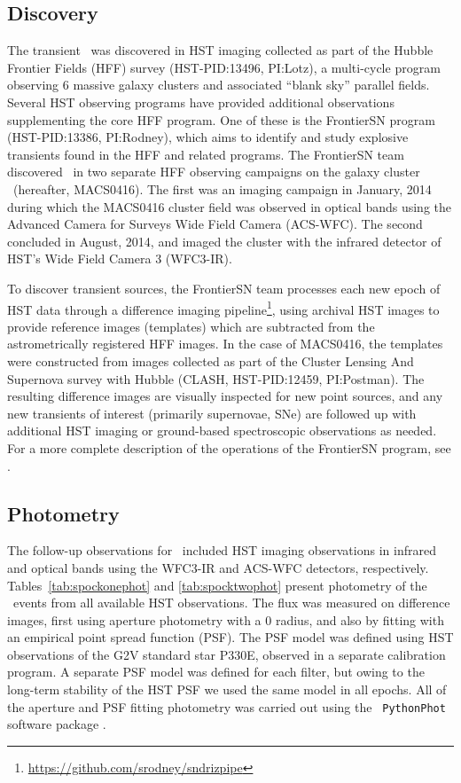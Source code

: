\subsection{Discovery}\label{sec:Discovery}

The transient \spock\ was discovered in HST imaging collected as part
of the Hubble Frontier Fields (HFF) survey (HST-PID:13496, PI:Lotz), a
multi-cycle program observing 6 massive galaxy clusters and associated
``blank sky'' parallel fields.  Several HST observing programs have
provided additional observations supplementing the core HFF program.
One of these is the FrontierSN program (HST-PID:13386, PI:Rodney),
which aims to identify and study explosive transients found in the HFF
and related programs.  The FrontierSN team discovered \spock\ in two
separate HFF observing campaigns on the galaxy cluster
\ (hereafter, MACS0416).  The first was an imaging campaign
in January, 2014 during which the MACS0416 cluster field was observed
in optical bands using the Advanced Camera for Surveys Wide Field
Camera (ACS-WFC).  The second concluded in August, 2014, and imaged
the cluster with the infrared detector of HST's Wide Field Camera 3
(WFC3-IR).

To discover transient sources, the FrontierSN team processes each new
epoch of HST data through a difference imaging
pipeline\footnote{\url{https://github.com/srodney/sndrizpipe}}, using
archival HST images to provide reference images (templates) which are
subtracted from the astrometrically registered HFF images. In the case
of MACS0416, the templates were constructed from images collected as
part of the Cluster Lensing And Supernova survey with Hubble (CLASH,
HST-PID:12459, PI:Postman). The resulting difference images are
visually inspected for new point sources, and any new transients of
interest (primarily supernovae, SNe) are followed up with additional
HST imaging or ground-based spectroscopic observations as needed.  For
a more complete description of the operations of the FrontierSN
program, see \citet{Rodney:2015a}.


\subsection{Photometry}\label{sec:Photometry}

The follow-up observations for \spock\ included HST imaging
observations in infrared and optical bands using the WFC3-IR and
ACS-WFC detectors, respectively. Tables~\ref{tab:spockonephot} and
\ref{tab:spocktwophot} present photometry of the \spock\ events from
all available HST observations. The flux was measured on difference
images, first using aperture photometry with a 0 radius, and
also by fitting with an empirical point spread function (PSF).  The
PSF model was defined using HST observations of the G2V standard star
P330E, observed in a separate calibration program.  A separate PSF
model was defined for each filter, but owing to the long-term
stability of the HST PSF we used the same model in all epochs.  All of
the aperture and PSF fitting photometry was carried out using the {\tt
  PythonPhot} software package \citep{Jones:2015}.


